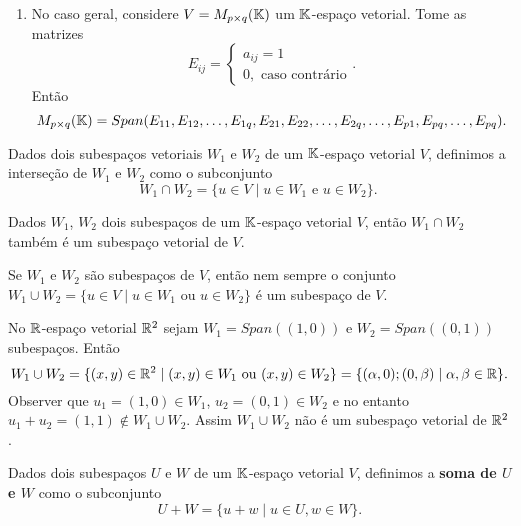 \begin{exemplos}
\begin{enumerate}
        \item No caso geral, considere $V = M_{p \times q}(\mathbb{K})$ um $\mathbb{K}$-espaço vetorial. Tome as matrizes
         \[
            E_{ij} = \begin{cases}
                a_{ij} = 1\\
                0, \mbox{ caso contrário}
                \end{cases}.
         \]
         Então
         \[
            M_{p \times q}(\mathbb{K}) = Span(E_{11}, E_{12}, \dots, E_{1q}, E_{21}, E_{22}, \dots, E_{2q}, \dots, E_{p1}, E_{pq}, \dots, E_{pq}).
         \]
    \end{enumerate}
\end{exemplos}

\begin{definicao}
	Dados dois subespaços vetoriais $W_1$ e $W_2$ de um $\mathbb{K}$-espaço vetorial $V$, definimos a interseção de $W_1$ e $W_2$ como o subconjunto
	\[
		W_1 \cap W_2 = \{u \in V \mid u\in W_1 \mbox{ e } u \in W_2\}.\
	\]
\end{definicao}


\begin{teorema}
	Dados $W_1$, $W_2$ dois subespaços de um $\mathbb{K}$-espaço vetorial $V$, então $W_1 \cap W_2$ também é um subespaço vetorial de $V$.
\end{teorema}

\begin{observacao}
	Se $W_1$ e $W_2$ são subespaços de $V$, então nem sempre o conjunto $W_1 \cup W_2 = \{u \in V \mid u \in W_1 \mbox{ ou } u \in W_2\}$ é um subespaço de $V$.
\end{observacao}

\begin{exemplo}
	No $\mathbb{R}$-espaço vetorial $\mathbb{R}^2$ sejam $W_1 = Span((1,0))$ e $W_2 = Span((0, 1))$ subespaços. Então
	\[
		W_1 \cup W_2 = \{(x, y) \in \mathbb{R}^2 \mid (x, y) \in W_1 \mbox{ ou } (x, y) \in W_2\} = \{(\alpha, 0); (0, \beta) \mid \alpha, \beta \in \mathbb{R}\}.
	\]
	Observer que $u_1 = (1, 0) \in W_1$, $u_2 = (0, 1) \in W_2$ e no entanto $u_1 + u_2 = (1, 1) \notin W_1 \cup W_2$. Assim $W_1 \cup W_2$ não é um subespaço vetorial de $\mathbb{R}^2$.
\end{exemplo}

\begin{definicao}
	Dados dois subespaços $U$ e $W$ de um $\mathbb{K}$-espaço vetorial $V$, definimos a \textbf{soma de $U$ e $W$} como o subconjunto
	\[
		U + W = \{u + w \mid u \in U, w \in W\}.
	\]
\end{definicao}

